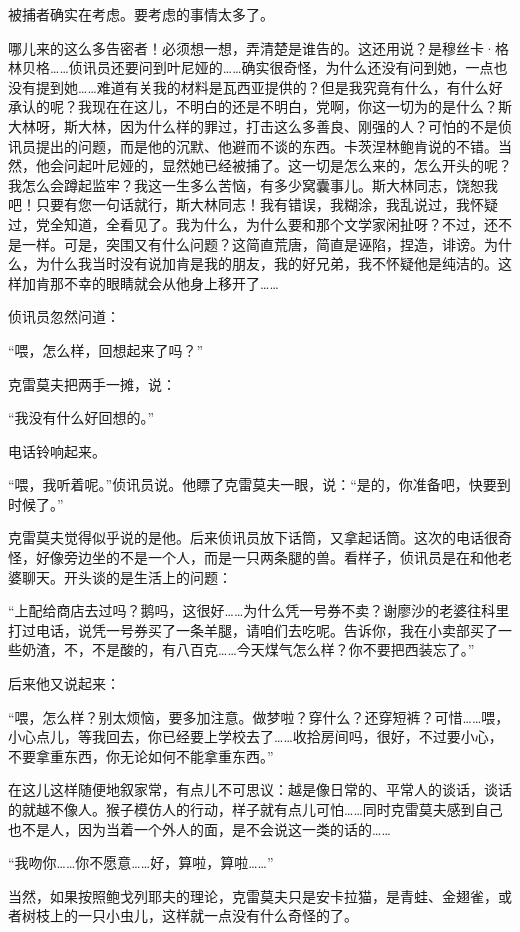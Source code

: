 被捕者确实在考虑。要考虑的事情太多了。

哪儿来的这么多告密者！必须想一想，弄清楚是谁告的。这还用说？是穆丝卡·格林贝格……侦讯员还要问到叶尼娅的……确实很奇怪，为什么还没有问到她，一点也没有提到她……难道有关我的材料是瓦西亚提供的？但是我究竟有什么，有什么好承认的呢？我现在在这儿，不明白的还是不明白，党啊，你这一切为的是什么？斯大林呀，斯大林，因为什么样的罪过，打击这么多善良、刚强的人？可怕的不是侦讯员提出的问题，而是他的沉默、他避而不谈的东西。卡茨涅林鲍肯说的不错。当然，他会问起叶尼娅的，显然她已经被捕了。这一切是怎么来的，怎么开头的呢？我怎么会蹲起监牢？我这一生多么苦恼，有多少窝囊事儿。斯大林同志，饶恕我吧！只要有您一句话就行，斯大林同志！我有错误，我糊涂，我乱说过，我怀疑过，党全知道，全看见了。我为什么，为什么要和那个文学家闲扯呀？不过，还不是一样。可是，突围又有什么问题？这简直荒唐，简直是诬陷，捏造，诽谤。为什么，为什么我当时没有说加肯是我的朋友，我的好兄弟，我不怀疑他是纯洁的。这样加肯那不幸的眼睛就会从他身上移开了……

侦讯员忽然问道：

“喂，怎么样，回想起来了吗？”

克雷莫夫把两手一摊，说：

“我没有什么好回想的。”

电话铃响起来。

“喂，我听着呢。”侦讯员说。他瞟了克雷莫夫一眼，说：“是的，你准备吧，快要到时候了。”

克雷莫夫觉得似乎说的是他。后来侦讯员放下话筒，又拿起话筒。这次的电话很奇怪，好像旁边坐的不是一个人，而是一只两条腿的兽。看样子，侦讯员是在和他老婆聊天。开头谈的是生活上的问题：

“上配给商店去过吗？鹅吗，这很好……为什么凭一号券不卖？谢廖沙的老婆往科里打过电话，说凭一号券买了一条羊腿，请咱们去吃呢。告诉你，我在小卖部买了一些奶渣，不，不是酸的，有八百克……今天煤气怎么样？你不要把西装忘了。”

后来他又说起来：

“喂，怎么样？别太烦恼，要多加注意。做梦啦？穿什么？还穿短裤？可惜……喂，小心点儿，等我回去，你已经要上学校去了……收拾房间吗，很好，不过要小心，不要拿重东西，你无论如何不能拿重东西。”

在这儿这样随便地叙家常，有点儿不可思议：越是像日常的、平常人的谈话，谈话的就越不像人。猴子模仿人的行动，样子就有点儿可怕……同时克雷莫夫感到自己也不是人，因为当着一个外人的面，是不会说这一类的话的……

“我吻你……你不愿意……好，算啦，算啦……”

当然，如果按照鲍戈列耶夫的理论，克雷莫夫只是安卡拉猫，是青蛙、金翅雀，或者树枝上的一只小虫儿，这样就一点没有什么奇怪的了。

